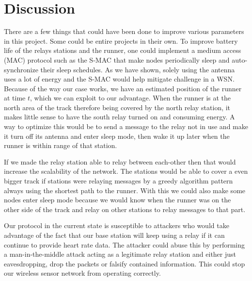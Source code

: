 \section{Discussion}

There are a few things that could have been done to improve various parameters in this project. Some could be entire projects in their own. To improve battery life of the relays stations and the runner, one could implement a medium access (MAC) protocol such as the S-MAC that make nodes periodically sleep and auto-synchronize their sleep schedules. As we have shown, solely using the antenna uses a lot of energy and the S-MAC would help mitigate challenge in a WSN. Because of the way our case works, we have an estimated position of the runner at time $t$, which we can exploit to our advantage. When the runner is at the north area of the track therefore being covered by the north relay station, it makes little sense to have the south relay turned on and consuming energy. A way to optimize this would be to send a message to the relay not in use and make it turn off its antenna and enter sleep mode, then wake it up later when the runner is within range of that station.

\noindent If we made the relay station able to relay between each-other then that would increase the scalability of the network. The stations would be able to cover a even bigger track if stations were relaying messages by a greedy algorithm pattern always using the shortest path to the runner. With this we could also make some nodes enter sleep mode because we would know when the runner was on the other side of the track and relay on other stations to relay messages to that part.

\noindent Our protocol in the current state is susceptible to attackers who would take advantage of the fact that our base station will keep using a relay if it can continue to provide heart rate data. The attacker could abuse this by performing a man-in-the-middle attack acting as a legitimate relay station and either just eavesdropping, drop the packets or falsify contained information. This could stop our wireless sensor network from operating correctly.
